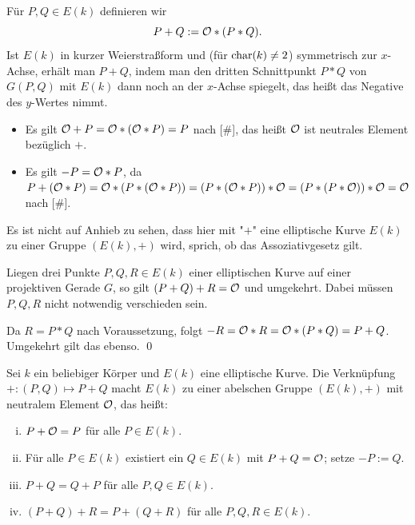 \begin{defn}
	Für $P,Q \in E(k)$ definieren wir
	\[P + Q := \mathcal{O} *(P * Q). \]
	Ist $E(k)$ in kurzer Weierstraßform und (für $\operatorname{char}(k) \neq 2$) symmetrisch zur $x$-Achse, erhält man $P+Q$, indem man den dritten Schnittpunkt $P*Q$ von $G(P,Q)$ mit $E(k)$ dann noch an der $x$-Achse spiegelt, das heißt das Negative des $y$-Wertes nimmt.
\end{defn}

\begin{bem}
\label{bem_13.8}
	\begin{itemize}
		\item Es gilt $\mathcal{O} + P = \mathcal{O} * (\mathcal{O} * P) = P$ nach [\#], das heißt $\mathcal{O}$ ist neutrales Element bezüglich $+$.
		\item Es gilt $-P = \mathcal{O} * P$, da $P + (\mathcal{O} * P) = \mathcal{O} * (P * (\mathcal{O} * P)) = (P * (\mathcal{O} * P)) * \mathcal{O} = (P * (P * \mathcal{O})) * \mathcal{O} = \mathcal{O}$ nach [\#].
	\end{itemize}
\end{bem}
Es ist nicht auf Anhieb zu sehen, dass hier mit "$+$" eine elliptische Kurve $E(k)$ zu einer Gruppe $(E(k),+)$ wird, sprich, ob das Assoziativgesetz gilt.

\begin{lemma}
\label{lemma_13.9}
	Liegen drei Punkte $P,Q,R \in E(k)$ einer elliptischen Kurve auf einer projektiven Gerade $G$, so gilt $(P+Q) + R = \mathcal{O}$ und umgekehrt. 
	Dabei müssen $P,Q,R$ nicht notwendig verschieden sein.
\end{lemma}

	Da $R = P *Q$ nach Voraussetzung, folgt $-R = \mathcal{O} * R = \mathcal{O} * (P * Q) = P+Q$. 
	Umgekehrt gilt das ebenso. \qed
	
\begin{satz}
	Sei $k$ ein beliebiger Körper und $E(k)$ eine elliptische Kurve. 
	Die Verknüpfung $+ \colon (P,Q) \mapsto P +Q$ macht $E(k)$ zu einer abelschen Gruppe $(E(k),+)$ mit neutralem Element $\mathcal{O}$, das heißt:
	\begin{enumerate}[(i)]
		\item $P+\mathcal{O} = P$ für alle $P \in E(k)$.
		\item Für alle $P \in E(k)$ existiert ein $Q \in E(k)$ mit $P+Q = \mathcal{O}$; setze $-P := Q$.
		\item $P + Q = Q + P$ für alle $P,Q \in E(k)$.
		\item $(P+Q) + R = P+(Q+R)$ für alle $P,Q,R \in E(k)$.
	\end{enumerate}
\end{satz}

